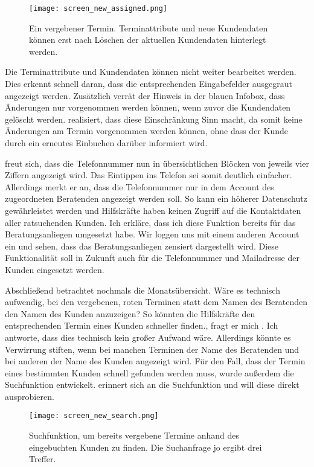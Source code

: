 \begin{figure}[H]
    \caption{Ein vergebener Termin. Terminattribute und neue Kundendaten können erst nach Löschen der aktuellen Kundendaten hinterlegt werden.}
    \centering
    \texttt{[image: screen\_new\_assigned.png]}
\end{figure}

Die Terminattribute und Kundendaten können nicht weiter bearbeitet werden. Dies
erkennt \ipName schnell daran, dass die entsprechenden Eingabefelder ausgegraut
angezeigt werden. Zusätzlich verrät der Hinweis in der blauen Infobox, dass
Änderungen nur vorgenommen werden können, wenn zuvor die Kundendaten gelöscht
werden. \ipName realisiert, dass diese Einschränkung Sinn macht, da somit keine
Änderungen am Termin vorgenommen werden können, ohne dass der Kunde durch ein
erneutes Einbuchen darüber informiert wird.

\ipName freut sich, dass die Telefonnummer nun in übersichtlichen Blöcken von jeweils vier Ziffern angezeigt wird. Das Eintippen ins Telefon sei somit deutlich einfacher. Allerdings merkt er an, dass die Telefonnummer nur in dem Account des zugeordneten Beratenden angezeigt werden soll. So kann ein höherer Datenschutz gewährleistet werden und Hilfskräfte haben keinen Zugriff auf die Kontaktdaten aller ratsuchenden Kunden. Ich erkläre, dass ich diese Funktion bereits für das Beratungsanliegen umgesetzt habe. Wir loggen uns mit einem anderen Account ein und sehen, dass das Beratungsanliegen zensiert dargestellt wird. Diese Funktionalität soll in Zukunft auch für die Telefonnummer und Mailadresse der Kunden eingesetzt werden.

Abschließend betrachtet \ipName nochmals die Monatsübersicht. \glqq{}Wäre es
technisch aufwendig, bei den vergebenen, roten Terminen statt dem Namen des
Beratenden den Namen des Kunden anzuzeigen? So könnten die Hilfskräfte den
entsprechenden Termin eines Kunden schneller finden.\grqq{}, fragt er
mich \cite{clavesUsertest}. Ich antworte, dass dies technisch kein großer
Aufwand wäre. Allerdings könnte es Verwirrung stiften, wenn bei manchen
Terminen der Name des Beratenden und bei anderen der Name des Kunden angezeigt
wird. Für den Fall, dass der Termin eines bestimmten Kunden schnell gefunden
werden muss, wurde außerdem die Suchfunktion entwickelt. \ipName erinnert sich
an die Suchfunktion und will diese direkt ausprobieren.

\begin{figure}[H]
    \caption{Suchfunktion, um bereits vergebene Termine anhand des eingebuchten Kunden zu finden. Die Suchanfrage \glqq{}jo\grqq{} ergibt drei Treffer.}
    \centering
    \texttt{[image: screen\_new\_search.png]}
\end{figure}

